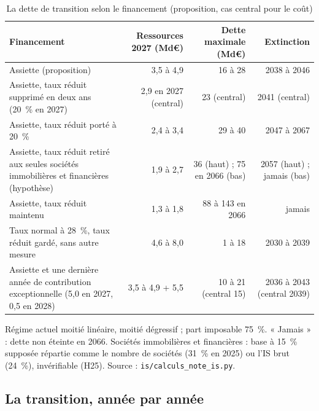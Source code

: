 



\begin{table}[!htbp]\centering\scriptsize
\caption{La dette de transition selon le financement (proposition, cas central pour le coût)}\label{tab:is_fin}
\begin{tabularx}{\linewidth}{@{}>{\raggedright\arraybackslash}X rrr@{}}
\toprule
Financement & Ressources 2027 (Md€) & Dette maximale (Md€) & Extinction \\
\midrule
Assiette (proposition) & 3,5 à 4,9 & 16 à 28 & 2038 à 2046 \\
Assiette, taux réduit supprimé en deux ans (20~\% en 2027) & 2,9 en 2027 (central) & 23 (central) & 2041 (central) \\
Assiette, taux réduit porté à 20~\% & 2,4 à 3,4 & 29 à 40 & 2047 à 2067 \\
Assiette, taux réduit retiré aux seules sociétés immobilières et financières (hypothèse) & 1,9 à 2,7 & 36 (haut) ; 75 en
2066 (bas) & 2057 (haut) ; jamais (bas) \\
Assiette, taux réduit maintenu & 1,3 à 1,8 & 88 à 143 en 2066 & jamais \\
Taux normal à 28~\%, taux réduit gardé, sans autre mesure & 4,6 à 8,0 & 1 à 18 & 2030 à 2039 \\
Assiette et une dernière année de contribution exceptionnelle (5,0 en 2027, 0,5 en 2028) & 3,5 à 4,9 + 5,5 & 10 à 21
(central 15) & 2036 à 2043 (central 2039) \\
\bottomrule
\end{tabularx}
\par\vspace{3pt}\parbox{\linewidth}{\raggedright\scriptsize Régime actuel moitié linéaire, moitié dégressif ; part
imposable 75~\%. « Jamais » : dette non éteinte en 2066. Sociétés immobilières et financières : base à 15~\% supposée
répartie comme le nombre de sociétés (31~\% en 2025) ou l'IS brut (24~\%), invérifiable (H25). Source :
\texttt{is/calculs\_note\_is.py}.}
\end{table}

\subsection{La transition, année par année}\label{ann:is_transition}

